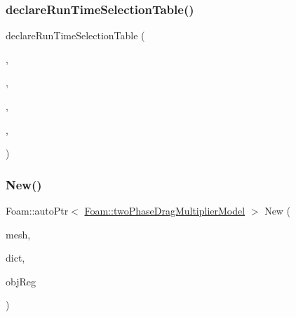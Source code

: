 \mbox{\label{classFoam_1_1twoPhaseDragMultiplierModel_a63a8414ae76095e1b37aaa1796577c17}} 
\subsubsection{\texorpdfstring{declare\+Run\+Time\+Selection\+Table()}{declareRunTimeSelectionTable()}}
{\footnotesize\ttfamily declare\+Run\+Time\+Selection\+Table (\begin{DoxyParamCaption}\item[{auto\+Ptr}]{,  }\item[{\hyperlink{classFoam_1_1twoPhaseDragMultiplierModel}{two\+Phase\+Drag\+Multiplier\+Model}}]{,  }\item[{two\+Phase\+Drag\+Multiplier\+Models}]{,  }\item[{(const fv\+Mesh \&\hyperlink{createMeshesPostProcess_8H_a8bb1e58291d2d2b653e024a4f4bffe38}{mesh}, const dictionary \&dict, const object\+Registry \&obj\+Reg)}]{,  }\item[{(\hyperlink{createMeshesPostProcess_8H_a8bb1e58291d2d2b653e024a4f4bffe38}{mesh}, dict, obj\+Reg)}]{ }\end{DoxyParamCaption})}

\mbox{\label{classFoam_1_1twoPhaseDragMultiplierModel_ac558677ecda41d9dd384c18870e3dce4}} 
\subsubsection{\texorpdfstring{New()}{New()}}
{\footnotesize\ttfamily Foam\+::auto\+Ptr$<$ \hyperlink{classFoam_1_1twoPhaseDragMultiplierModel}{Foam\+::two\+Phase\+Drag\+Multiplier\+Model} $>$ New (\begin{DoxyParamCaption}\item[{const fv\+Mesh \&}]{mesh,  }\item[{const dictionary \&}]{dict,  }\item[{const object\+Registry \&}]{obj\+Reg }\end{DoxyParamCaption})\hspace{0.3cm}{\ttfamily [static]}}



